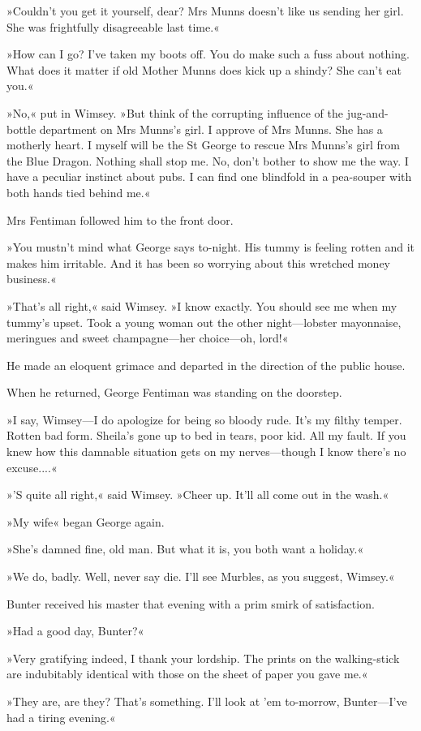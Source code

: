 »Couldn't you get it yourself, dear? Mrs Munns doesn't like us sending her girl. She was frightfully disagreeable last time.«

»How can I go? I've taken my boots off. You do make such a fuss about nothing. What does it matter if old Mother Munns does kick up a shindy? She can't eat you.«

»No,« put in Wimsey. »But think of the corrupting influence of the jug-and-bottle department on Mrs Munns's girl. I approve of Mrs Munns. She has a motherly heart. I myself will be the St George to rescue Mrs Munns's girl from the Blue Dragon. Nothing shall stop me. No, don't bother to show me the way. I have a peculiar instinct about pubs. I can find one blindfold in a pea-souper with both hands tied behind me.«

Mrs Fentiman followed him to the front door.

»You mustn't mind what George says to-night. His tummy is feeling rotten and it makes him irritable. And it has been so worrying about this wretched money business.«

»That's all right,« said Wimsey. »I know exactly. You should see me when my tummy's upset. Took a young woman out the other night—lobster mayonnaise, meringues and sweet champagne—her choice—oh, lord!«

He made an eloquent grimace and departed in the direction of the public house.

When he returned, George Fentiman was standing on the doorstep.

»I say, Wimsey—I do apologize for being so bloody rude. It's my filthy temper. Rotten bad form. Sheila's gone up to bed in tears, poor kid. All my fault. If you knew how this damnable situation gets on my nerves—though I know there's no excuse....«

»'S quite all right,« said Wimsey. »Cheer up. It'll all come out in the wash.«

»My wife\longdash« began George again.

»She's damned fine, old man. But what it is, you both want a holiday.«

»We do, badly. Well, never say die. I'll see Murbles, as you suggest, Wimsey.«

Bunter received his master that evening with a prim smirk of satisfaction.

»Had a good day, Bunter?«

»Very gratifying indeed, I thank your lordship. The prints on the walking-stick are indubitably identical with those on the sheet of paper you gave me.«

»They are, are they? That's something. I'll look at 'em to-morrow, Bunter—I've had a tiring evening.«